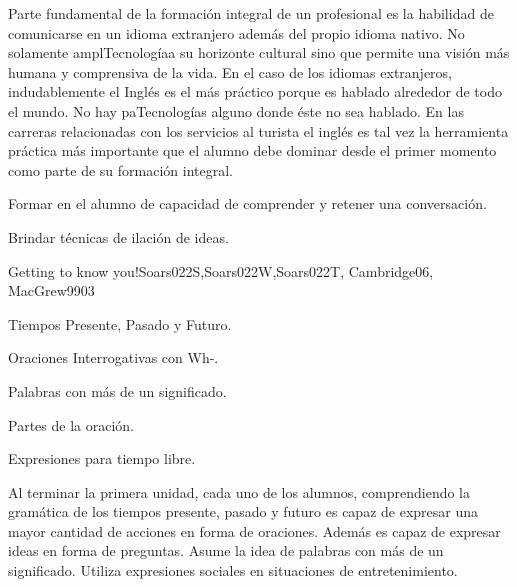 \begin{syllabus}


\begin{justification}
Parte fundamental de la formación integral de un profesional es la habilidad de 
comunicarse en un idioma extranjero además del propio idioma nativo. No solamente 
amplTecnologíaa su horizonte cultural sino que permite una visión más humana y comprensiva 
de la vida. En el caso de los idiomas extranjeros, indudablemente el Inglés es el 
más práctico porque es hablado alrededor de todo el mundo. No hay paTecnologías alguno donde 
éste no sea hablado. En las carreras relacionadas con los servicios al turista el 
inglés es tal vez la herramienta práctica más importante que el alumno debe dominar 
desde el primer momento como parte de su formación integral.
\end{justification}

\begin{goals}
\item Formar en el alumno de capacidad de comprender y retener una conversación.
\item Brindar técnicas de ilación de ideas.
\end{goals}

\begin{outcomes}
\end{outcomes}

\begin{unit}{Getting to know you!}{Soars022S,Soars022W,Soars022T, Cambridge06, MacGrew99}{0}{3}
   \begin{topics}
      \item Tiempos Presente, Pasado y Futuro.
      \item Oraciones Interrogativas con Wh-.
      \item Palabras con más de un significado.
      \item Partes de la oración.
      \item Expresiones para tiempo libre.
   \end{topics}

   \begin{unitgoals}
      \item Al terminar la primera unidad, cada uno de los alumnos, comprendiendo la gramática de los tiempos presente, pasado y futuro es capaz de expresar una mayor cantidad de acciones en forma de oraciones.  Además es capaz de expresar ideas en forma de preguntas.  Asume la idea de palabras con más de un significado. Utiliza expresiones sociales en situaciones de entretenimiento. 
   \end{unitgoals}
\end{unit}


\end{syllabus}
